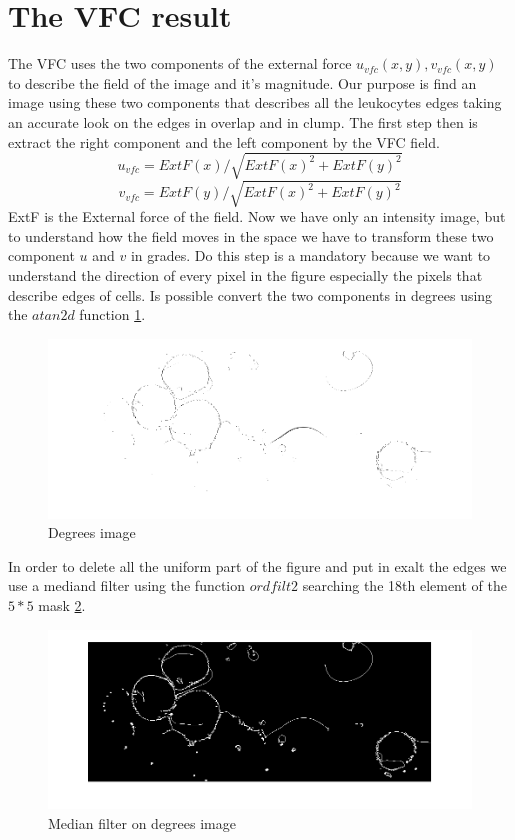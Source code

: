 \section{The VFC result}
The VFC uses the two components of the external force ${u} _{vfc} ( x,y ) , {v} _{vfc} (x,y)$ to describe the field of the image and it's magnitude. Our purpose is find an image using these two components that describes all the leukocytes edges taking an accurate look on the edges in overlap and in clump. The first step then is extract the right component and the left component by the VFC field.
\begin{equation}
{u} _{vfc}=ExtF(x)/\sqrt{ExtF(x)^{2} + ExtF(y)^{2}}
\end{equation}
\begin{equation}
{v} _{vfc}=ExtF(y)/\sqrt{ExtF(x)^{2} + ExtF(y)^{2}}
\end{equation}
ExtF is the External force of the field. Now we have only an intensity image, but to understand how the field moves in the space we have to transform these two component $ u$ and $ v $ in grades. Do this step is a mandatory because we want to understand the direction of every pixel in the figure especially the pixels that describe edges of cells. Is possible convert the two components in degrees using the $atan2d$ function \ref{fig:angle}.
\begin{figure}
	\begin{center}
		\centering
		\includegraphics[scale=0.5]{img/angle.png}
		\caption{Degrees image}
		\label{fig:angle}
	\end{center}
\end{figure}
In order to delete all the uniform part of the figure and put in exalt the edges we use a mediand filter using the function $ordfilt2$ searching the 18th element of the $5 * 5$ mask \ref{fig:Pmedangle}.
\begin{figure}
	\begin{center}
		\centering
		\includegraphics[scale=0.5]{img/PmedAngle.png}
		\caption{Median filter on degrees image}
		\label{fig:Pmedangle}
	\end{center}
\end{figure}

